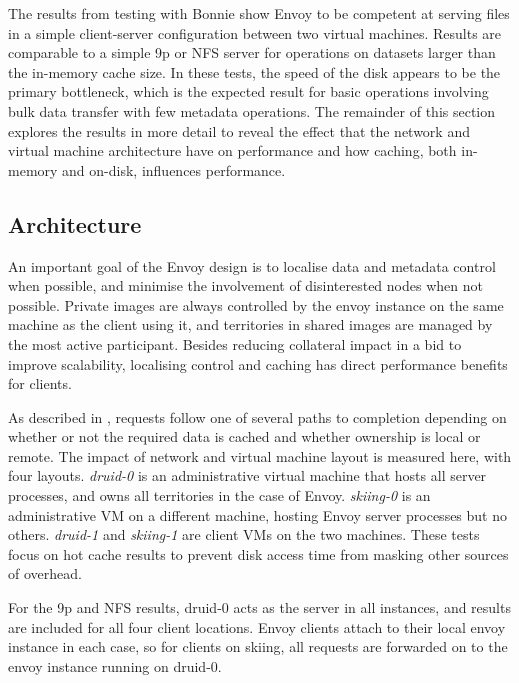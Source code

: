 The results from testing with Bonnie show Envoy to be competent at serving files in a simple client-server configuration between two virtual machines. Results are comparable to a simple 9p or NFS server for operations on datasets larger than the in-memory cache size. In these tests, the speed of the disk appears to be the primary bottleneck, which is the expected result for basic operations involving bulk data transfer with few metadata operations. The remainder of this section explores the results in more detail to reveal the effect that the network and virtual machine architecture have on performance and how caching, both in-memory and on-disk, influences performance.

\subsection{Architecture}\label{sec:architectural-costs}

An important goal of the Envoy design is to localise data and metadata control when possible, and minimise the involvement of disinterested nodes when not possible. Private images are always controlled by the envoy instance on the same machine as the client using it, and territories in shared images are managed by the most active participant. Besides reducing collateral impact in a bid to improve scalability, localising control and caching has direct performance benefits for clients.

As described in , requests follow one of several paths to completion depending on whether or not the required data is cached and whether ownership is local or remote. The impact of network and virtual machine layout is measured here, with four layouts. \emph{druid-0} is an administrative virtual machine that hosts all server processes, and owns all territories in the case of Envoy. \emph{skiing-0} is an administrative VM on a different machine, hosting Envoy server processes but no others. \emph{druid-1} and \emph{skiing-1} are client VMs on the two machines. These tests focus on hot cache results to prevent disk access time from masking other sources of overhead.

For the 9p and NFS results, druid-0 acts as the server in all instances, and results are included for all four client locations. Envoy clients attach to their local envoy instance in each case, so for clients on skiing, all requests are forwarded on to the envoy instance running on druid-0.

